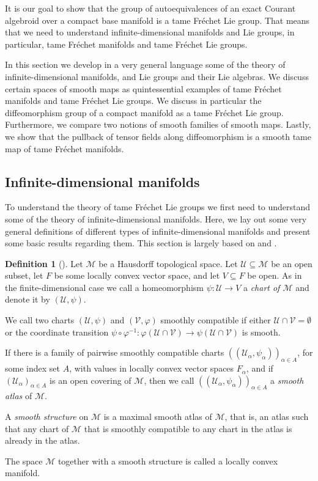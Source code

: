 \documentclass[12pt,a4paper]{article}
\theoremstyle{plain}
\theoremstyle{definition}
\newtheorem{definition}[theorem]{Definition}
\newcommand{\Mcal}{\mathcal{M}}
\newcommand{\Ucal}{\mathcal{U}}
\newcommand{\Vcal}{\mathcal{V}}
\begin{document}
It is our goal to show that the group of autoequivalences of an exact Courant algebroid over a compact base manifold is a tame Fréchet Lie group. That means that we need to understand infinite-dimensional manifolds and Lie groups, in particular, tame Fréchet manifolds and tame Fréchet Lie groups.

In this section we develop in a very general language some of the theory of infinite-dimensional manifolds, and Lie groups and their Lie algebras. We discuss certain spaces of smooth maps as quintessential examples of tame Fréchet manifolds and tame Fréchet Lie groups. We discuss in particular the diffeomorphism group of a compact manifold as a tame Fréchet Lie group. Furthermore, we compare two notions of smooth families of smooth maps. Lastly, we show that the pullback of tensor fields along diffeomorphism is a smooth tame map of tame Fréchet manifolds.

\subsection{Infinite-dimensional manifolds}

To understand the theory of tame Fréchet Lie groups we first need to understand some of the theory of infinite-dimensional manifolds. Here, we lay out some very general definitions of different types of infinite-dimensional manifolds and present some basic results regarding them. This section is largely based on \cite{InfDimLieneeb} and \cite{hamilton}.

\begin{definition}[{\cite[Definition II.3.1]{InfDimLieneeb}}]
Let $\Mcal$ be a Hausdorff topological space. Let $\Ucal\subseteq \Mcal$ be an open subset, let $F$ be some locally convex vector space, and let $V\subseteq F$ be open. As in the finite-dimensional case we call a homeomorphism $\psi:\Ucal\to V$ a \textit{chart of $\Mcal$} and denote it by $(\Ucal,\psi)$.  

We call two charts $(\Ucal,\psi)$ and $(\mathcal{V},\varphi)$ smoothly compatible if either $\Ucal\cap \Vcal=\emptyset$ or the coordinate transition $\psi\circ \varphi^{-1}:\varphi(\Ucal \cap \Vcal)\to \psi(\Ucal \cap \Vcal)$ is smooth.

If there is a family of pairwise smoothly compatible charts $((\Ucal_\alpha,\psi_\alpha))_{\alpha \in A}$, for some index set $A$, with values in locally convex vector spaces $F_\alpha$, and if $(\Ucal_\alpha)_{\alpha\in A}$ is an open covering of $\Mcal$, then we call $((\Ucal_\alpha,\psi_\alpha))_{\alpha \in A}$ a \textit{smooth atlas} of $\Mcal$. 

A \textit{smooth structure} on $\Mcal$ is a maximal smooth atlas of $\Mcal$, that is, an atlas such that any chart of $\Mcal$ that is smoothly compatible to any chart in the atlas is already in the atlas. 

The space $\Mcal$ together with a smooth structure is called a locally convex manifold.
\end{definition}
\end{document}
